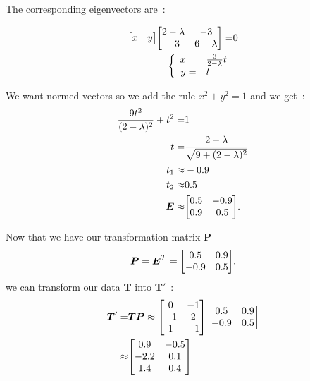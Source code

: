 \documentclass[11pt,twocolumn]{amsart} %
\newcommand{\ma}[1]{\boldsymbol{#1}}
\newenvironment{m}{\begin{bmatrix}}{\end{bmatrix}}
\begin{document}
The corresponding eigenvectors are~:

\begin{align*}
  \begin{m}x & y\end{m}\begin{m} 2-\lambda & -3 \\ -3 & 6-\lambda \end{m} = & 0 \\
  \left\{ \begin{array}{rl} x = & \frac{3}{2-\lambda} t \\ y = & t \end{array} \right.
\end{align*}

We want normed vectors so we add the rule $x^2 + y^2 = 1$ and we get~:
\begin{align*}
  \frac{9t^2}{(2 - \lambda)^2} + t^2 = & 1 \\
  t = & \frac{2-\lambda}{\sqrt{9 + (2 - \lambda)^2}} \\
  t_1 \approx & -0.9 \\
  t_2 \approx & 0.5 \\
  \ma{E} \approx & \begin{m}0.5 & -0.9 \\ 0.9 & 0.5 \end{m}.
\end{align*}

Now that we have our transformation matrix $\ma{P}$
\[
  \ma{P} = \ma{E}^T = \begin{m}0.5 & 0.9 \\ -0.9 & 0.5 \end{m}.
\]
we can transform our data $\ma{T}$ into $\ma{T}'$~:
\begin{align*}
  \ma{T}' = & \ma{T}\ma{P} \approx \begin{m} 0 & -1 \\ -1 & 2 \\ 1 & -1\end{m}\begin{m}0.5 & 0.9 \\ -0.9 & 0.5 \end{m} \\
    \approx & \begin{m} 0.9 & -0.5 \\ -2.2 & 0.1 \\ 1.4 & 0.4 \\ \end{m}
\end{align*}
\end{document}

